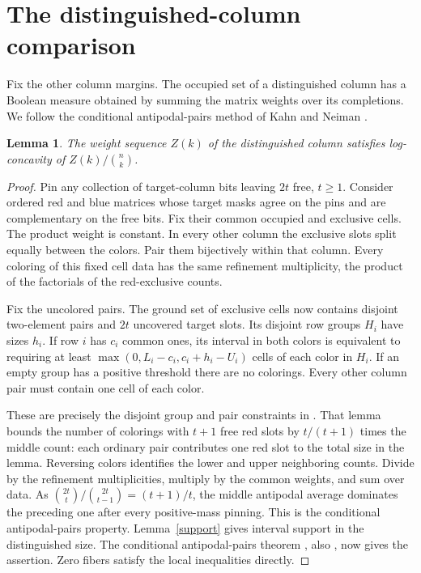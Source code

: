 \documentclass[11pt]{article}
\newtheorem{lemma}[theorem]{Lemma}
\begin{document}
\section{The distinguished-column comparison}
Fix the other column margins. The occupied set of a distinguished column has a Boolean measure obtained by summing the matrix weights over its completions. We follow the conditional antipodal-pairs method of Kahn and Neiman \cite{app,urns}.
\begin{lemma}\label{ulc}
The weight sequence $Z(k)$ of the distinguished column satisfies log-concavity of $Z(k)/\binom nk$.
\end{lemma}
\begin{proof}
Pin any collection of target-column bits leaving $2t$ free, $t\ge1$. Consider ordered red and blue matrices whose target masks agree on the pins and are complementary on the free bits. Fix their common occupied and exclusive cells. The product weight is constant. In every other column the exclusive slots split equally between the colors. Pair them bijectively within that column. Every coloring of this fixed cell data has the same refinement multiplicity, the product of the factorials of the red-exclusive counts.

Fix the uncolored pairs. The ground set of exclusive cells now contains disjoint two-element pairs and $2t$ uncovered target slots. Its disjoint row groups $H_i$ have sizes $h_i$. If row $i$ has $c_i$ common ones, its interval in both colors is equivalent to requiring at least $\max(0,L_i-c_i,c_i+h_i-U_i)$ cells of each color in $H_i$. If an empty group has a positive threshold there are no colorings. Every other column pair must contain one cell of each color.

These are precisely the disjoint group and pair constraints in \cite[Lemma~10]{urns}. That lemma bounds the number of colorings with $t+1$ free red slots by $t/(t+1)$ times the middle count: each ordinary pair contributes one red slot to the total size in the lemma. Reversing colors identifies the lower and upper neighboring counts. Divide by the refinement multiplicities, multiply by the common weights, and sum over data. As $\binom{2t}{t}/\binom{2t}{t-1}=(t+1)/t$, the middle antipodal average dominates the preceding one after every positive-mass pinning. This is the conditional antipodal-pairs property. Lemma~\ref{support} gives interval support in the distinguished size. The conditional antipodal-pairs theorem \cite{app}, also \cite[Theorem~11]{urns}, now gives the assertion. Zero fibers satisfy the local inequalities directly.
\end{proof}
\end{document}

